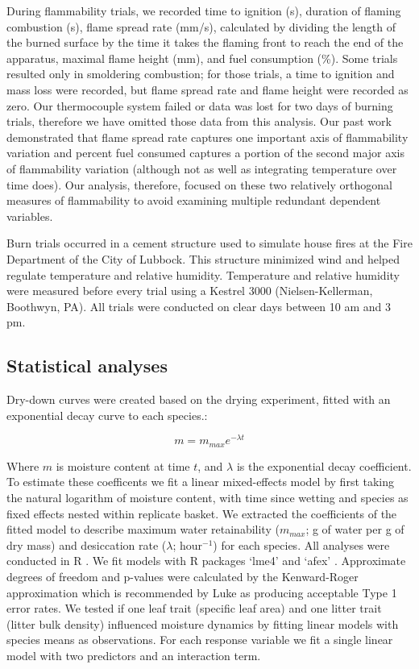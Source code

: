 \documentclass[fire,article,submit,moreauthors,pdftex]{Definitions/mdpi}
\begin{document}
During flammability trials, we recorded time to ignition (s), duration of
flaming combustion (s), flame spread rate (mm/s), calculated by dividing the
length of the burned surface by the time it takes the flaming front to reach
the end of the apparatus, maximal flame height (mm), and fuel consumption (\%).
Some trials resulted only in smoldering combustion; for those trials, a time to
ignition and mass loss were recorded, but flame spread rate and flame height
were recorded as zero. Our thermocouple system failed or data was lost for two
days of burning trials, therefore we have omitted those data from this
analysis. Our past work \cite{Magalhaes+Schwilk-2012} demonstrated that flame
spread rate captures one important axis of flammability variation
\citep{Schwilk-2015, Pausas+Keeley+etal-2017} and percent fuel consumed
captures a portion of the second major axis of flammability variation (although
not as well as integrating temperature over time does). Our analysis,
therefore, focused on these two relatively orthogonal measures of flammability
to avoid examining multiple redundant dependent variables.

Burn trials occurred in a cement structure used to simulate house fires at the
Fire Department of the City of Lubbock. This structure minimized wind and
helped regulate temperature and relative humidity. Temperature and relative
humidity were measured before every trial using a Kestrel 3000
(Nielsen-Kellerman, Boothwyn, PA). All trials were conducted on clear days
between 10 am and 3 pm.

\subsection{Statistical analyses}

Dry-down curves were created based on the drying experiment, fitted with an exponential decay curve to each species.:

\begin{equation}
m = m_{max} e^{-\lambda t}
\end{equation}

Where $m$ is moisture content at time $t$, and $\lambda$ is the exponential
decay coefficient. To estimate these coefficents we fit a linear mixed-effects
model by first taking the natural logarithm of moisture content, with time
since wetting and species as fixed effects nested within replicate basket. We
extracted the coefficients of the fitted model to describe maximum water
retainability ($m_{max}$; g of water per g of dry mass) and desiccation rate
($\lambda$; hour$^{-1}$) for each species. All analyses were conducted in R
\cite{RCoreTeam-2019}. We fit models with R packages `lme4'
\cite{Bates_Machler_etal-2015} and `afex' \cite{Singmann_Bolker_etal-2017}.
Approximate degrees of freedom and p-values were calculated by the
Kenward-Roger approximation \cite{Kenward_Roger-1997} which is recommended by
Luke \cite{Luke-2017} as producing acceptable Type 1 error rates. We tested if
one leaf trait (specific leaf area) and one litter trait (litter bulk density)
influenced moisture dynamics by fitting linear models with species means as
observations. For each response variable we fit a single linear model with two
predictors and an interaction term.
\end{document}
